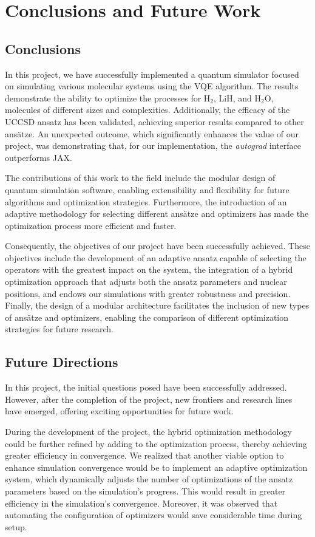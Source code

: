 \chapter{Conclusions and Future Work}

\section{Conclusions}

In this project, we have successfully implemented a quantum simulator focused on simulating various molecular systems using the VQE algorithm. The results demonstrate the ability to optimize the processes for H$_2$, LiH, and H$_2$O, molecules of different sizes and complexities. Additionally, the efficacy of the UCCSD ansatz has been validated, achieving superior results compared to other ansätze. An unexpected outcome, which significantly enhances the value of our project, was demonstrating that, for our implementation, the \textit{autograd} interface outperforms JAX.

The contributions of this work to the field include the modular design of quantum simulation software, enabling extensibility and flexibility for future algorithms and optimization strategies. Furthermore, the introduction of an adaptive methodology for selecting different ansätze and optimizers has made the optimization process more efficient and faster.

Consequently, the objectives of our project have been successfully achieved. These objectives include the development of an adaptive ansatz capable of selecting the operators with the greatest impact on the system, the integration of a hybrid optimization approach that adjusts both the ansatz parameters and nuclear positions, and endows our simulations with greater robustness and precision. Finally, the design of a modular architecture facilitates the inclusion of new types of ansätze and optimizers, enabling the comparison of different optimization strategies for future research.

\section{Future Directions}
In this project, the initial questions posed have been successfully addressed. However, after the completion of the project, new frontiers and research lines have emerged, offering exciting opportunities for future work.

During the development of the project, the hybrid optimization methodology could be further refined by adding to the optimization process, thereby achieving greater efficiency in convergence. We realized that another viable option to enhance simulation convergence would be to implement an adaptive optimization system, which dynamically adjusts the number of optimizations of the ansatz parameters based on the simulation’s progress. This would result in greater efficiency in the simulation’s convergence. Moreover, it was observed that automating the configuration of optimizers would save considerable time during setup.

